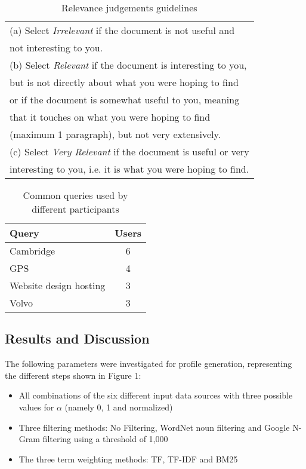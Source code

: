 \documentclass{sig-alternate}
\begin{document}
\begin{table}
\centering
\caption{Relevance judgements guidelines}
\begin{tabular}{|l|} \hline
(a) Select \emph{Irrelevant} if the document is not useful and\\
not interesting to you.\\
(b) Select \emph{Relevant} if the document is interesting to you,\\
but is not directly about what you were hoping to find\\
or if the document is somewhat useful to you, meaning\\
that it touches on what you were hoping to find\\
(maximum 1 paragraph), but not very extensively.\\
(c) Select \emph{Very Relevant} if the document is useful or very\\
interesting to you, i.e. it is what you were hoping to find.\\
\hline\end{tabular}
\label{tab:guidelines}
\end{table}

\begin{table}
\centering
\caption{Common queries used by different participants}
\begin{tabular}{|l|c|} \hline
\textbf{Query}&\textbf{Users}\\ \hline
Cambridge&6\\ \hline
GPS&4\\ \hline
Website design hosting&3\\ \hline
Volvo&3\\
\hline\end{tabular}
\label{tab:queries}
\end{table}

\subsection{Results and Discussion}

The following parameters were investigated for profile generation, representing the different steps shown in Figure 1:

\begin{itemize}
\item All combinations of the six different input data sources with three possible values for $\alpha$ (namely 0, 1 and normalized)
\item Three filtering methods: No Filtering, WordNet noun filtering and Google N-Gram filtering using a threshold of 1,000
\item The three term weighting methods: TF, TF-IDF and BM25
\end{itemize}
\end{document}
